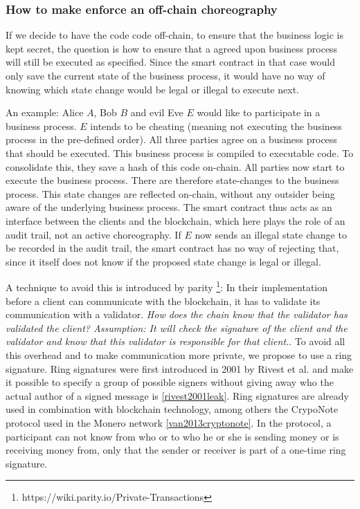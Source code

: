 \documentclass[runningheads]{llncs}
\begin{document}
\subsubsection{How to make enforce an off-chain choreography}

If we decide to have the code code off-chain, to ensure that the business logic is kept secret, the question is how to ensure that a agreed upon business process will still be executed as specified. Since the smart contract in that case would only save the current state of the business process, it would have no way of knowing which state change would be legal or illegal to execute next.

An example: Alice $A$, Bob $B$ and evil Eve $E$ would like to participate in a business process. $E$ intends to be cheating (meaning not executing the business process in the pre-defined order). All three parties agree on a business process that should be executed. This business process is compiled to executable code. To consolidate this, they save a hash of this code on-chain. All parties now start to execute the business process. There are therefore state-changes to the business process. This state changes are reflected on-chain, without any outsider being aware of the underlying business process. The smart contract thus acts as an interface between the clients and the blockchain, which here plays the role of an audit trail, not an active choreography. If $E$ now sends an illegal state change to be recorded in the audit trail, the smart contract has no way of rejecting that, since it itself does not know if the proposed state change is legal or illegal.

A technique to avoid this is introduced by parity \footnote{https://wiki.parity.io/Private-Transactions}: In their implementation before a client can communicate with the blockchain, it has to validate its communication with a validator. \textit{How does the chain know that the validator has validated the client? Assumption: It will check the signature of the client and the validator and know that this validator is responsible for that client.}. To avoid all this overhead and to make communication more private, we propose to use a ring signature. Ring signatures were first introduced in 2001 by Rivest et al. and make it possible to specify a group of possible signers without giving away who the actual author of a signed message is \ref{rivest2001leak}. Ring signatures are already used in combination with blockchain technology, among others the CrypoNote protocol used in the Monero network \ref{van2013cryptonote}. In the protocol, a participant can not know from who or to who he or she is sending money or is receiving money from, only that the sender or receiver is part of a one-time ring signature.
\end{document}
